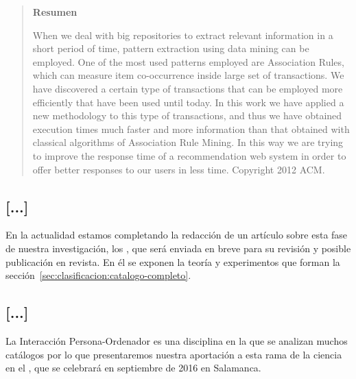 \begin{quotation}
	\noindent\textbf{Resumen}

	\nopagebreak When we deal with big repositories to extract relevant information in a short period of time, pattern extraction using data mining can be employed. One of the most used patterns employed are Association Rules, which can measure item co-occurrence inside large set of transactions. We have discovered a certain type of transactions that can be employed more efficiently that have been used until today. In this work we have applied a new methodology to this type of transactions, and thus we have obtained execution times much faster and more information than that obtained with classical algorithms of Association Rule Mining. In this way we are trying to improve the response time of a recommendation web system in order to offer better responses to our users in less time. Copyright 2012 ACM.
\end{quotation}








\subsection{[...]}
\label{sec:clasificacion:publicaciones:articulo}
En la actualidad estamos completando la redacción de un artículo sobre esta fase de nuestra investigación, los \CCs, que será enviada en breve para su revisión y posible publicación en revista. En él se exponen la teoría y experimentos que forman la sección~\ref{sec:clasificacion:catalogo-completo}.




\subsection{[...]}
\label{sec:clasificacion:publicaciones:interaccion-2016}
La Interacción Persona-Ordenador es una disciplina en la que se analizan muchos catálogos por lo que presentaremos nuestra aportación a esta rama de la ciencia en el , que se celebrará en septiembre de 2016 en Salamanca.

